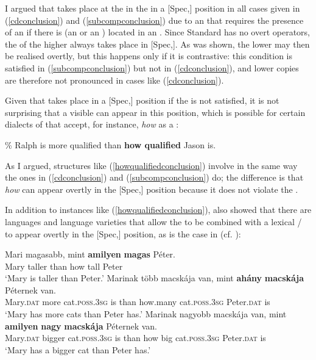 I argued that  takes place at the  in the  in a [Spec,] position in all cases given in (\ref{cdconclusion}) and (\ref{subcompconclusion}) due to an  that requires the presence of an  if there is  (an  or an ) located in an . Since Standard  has no overt operators, the  of the higher  always takes place in [Spec,]. As was shown, the lower  may then be realised overtly, but this happens only if it is contrastive: this condition is satisfied in (\ref{subcompconclusion}) but not in (\ref{cdconclusion}), and lower copies are therefore not pronounced in cases like (\ref{cdconclusion}).

Given that  takes place in a [Spec,] position if the  is not satisfied, it is not surprising that a visible  can appear in this position, which is possible for certain dialects of  that accept, for instance, \textit{how} as a :

\ea	\% Ralph is more qualified than \textbf{how qualified} Jason is. \label{howqualifiedconclusion}
\z

As I argued, structures like (\ref{howqualifiedconclusion}) involve  in the same way the ones in (\ref{cdconclusion}) and (\ref{subcompconclusion}) do; the difference is that \textit{how} can appear overtly in the [Spec,] position because it does not violate the .

In addition to instances like (\ref{howqualifiedconclusion}),  also showed that there are languages and language varieties that allow the  to be combined with a lexical / to appear overtly in the [Spec,] position, as is the case in  (cf. \citealt{kenesei1992}):

\ea \label{hungfull}
\ea \gll Mari magasabb, mint \textbf{amilyen} \textbf{magas} P\'eter. \label{hungpredfullconclusion}\\
Mary taller than how tall Peter\\
\glt `Mary is taller than Peter.'
\ex \gll Marinak t\"{o}bb macsk\'aja van, mint \textbf{ah\'any} \textbf{macsk\'aja} P\'eternek van.\\
Mary.\textsc{dat} more cat.\textsc{poss.3sg} is than how.many cat.\textsc{poss.3sg} Peter.\textsc{dat} is\\
\glt `Mary has more cats than Peter has.'
\ex \gll Marinak nagyobb macsk\'aja van, mint \textbf{amilyen} \textbf{nagy} \textbf{macsk\'aja} P\'eternek van.\\
Mary.\textsc{dat} bigger cat.\textsc{poss.3sg} is than how big	cat.\textsc{poss.3sg} Peter.\textsc{dat} is\\
\glt `Mary has a bigger cat than Peter has.'
\z
\z

